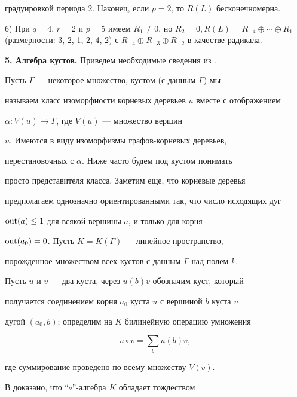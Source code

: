 градуировкой периода 2. Наконец, если $p=2$, то $R(L)$ бесконечномерна.





6) При $q=4$, $r=2$ и $p=5$ имеем $R_1\ne 0$, но $R_2=0, R(L)=


R_{-4}\oplus \dotsb \oplus R_1$ (размерности: 3, 2, 1, 2, 4, 2) с $R_{-4}


\oplus R_{-3}\oplus R_{-2}$ в качестве радикала.


\medskip





{\bf 5. Алгебра кустов.} Приведем необходимые сведения из \cite{Erm}.


Пусть $\Gamma $ --- некоторое множество, кустом (с данным $\Gamma $) мы


называем класс изоморфности корневых деревьев $u$ вместе с отображением


$\alpha : V(u) \to \Gamma $, где $V(u)$ --- множество вершин


$u$. Имеются в виду изоморфизмы графов-корневых деревьев,


перестановочных с $\alpha $. Ниже часто будем под кустом понимать


просто представителя класса. Заметим еще, что корневые деревья


предполагаем однозначно ориентированными так, что число исходящих дуг


$\operatorname{out}(a)\le 1$ для всякой вершины $a$, и только для корня


$\operatorname{out}(a_0)=0$. Пусть $K=K(\Gamma )$ --- линейное пространство,


порожденное множеством всех кустов с данным $\Gamma $ над полем $k$.


Пусть $u$ и $v$ --- два куста, через $u(b)v$ обозначим куст, который


получается соединением корня $a_0$ куста $u$ с вершиной $b$ куста $v$


дугой $(a_0,b)$; определим на $K$ билинейную операцию умножения


$$


u \circ v=\sum _b u(b)v,


$$


где суммирование проведено по всему множеству $V(v)$.





В \cite{Erm} доказано, что ``$\circ$''-алгебра $K$ обладает тождеством


